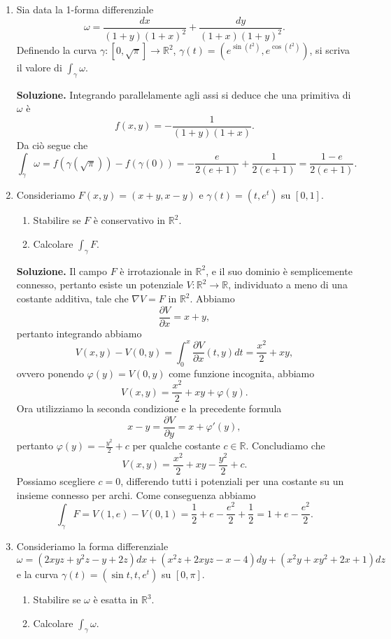 \begin{enumerate}
	
	\item Sia data la 1-forma differenziale
	\[
	\omega = \frac{dx}{(1 + y)(1 + x)^2} + \frac{dy}{(1 + x)(1 + y)^2}.
	\]
	Definendo la curva $\gamma: [0, \sqrt{\pi}] \to \mathbb{R}^2$, $\gamma(t) = \left(e^{\sin(t^2)}, e^{\cos(t^2)}\right)$, si scriva il valore di $\int_{\gamma} \omega$.
	
	\textbf{Soluzione.}
		Integrando parallelamente agli assi si deduce che una primitiva di $\omega$ è
		\[
		f(x,y) = -\frac{1}{(1 + y)(1 + x)}.
		\]
		Da ciò segue che
		\[
		\int_{\gamma} \omega = f(\gamma(\sqrt{\pi})) - f(\gamma(0)) = -\frac{e}{2(e + 1)} + \frac{1}{2(e + 1)} = \frac{1 - e}{2(e + 1)}.
		\]

	
	\item Consideriamo $F(x,y) = (x + y, x - y)$ e $\gamma(t) = (t, e^t)$ su $[0,1]$.
	\begin{enumerate}
		\item Stabilire se $F$ è conservativo in $\mathbb{R}^2$.
		\item Calcolare $\int_{\gamma} F$.
	\end{enumerate}
	
	\textbf{Soluzione.}
		Il campo $F$ è irrotazionale in $\mathbb{R}^2$, e il suo dominio è semplicemente connesso, pertanto esiste un potenziale $V: \mathbb{R}^2 \to \mathbb{R}$, individuato a meno di una costante additiva, tale che $\nabla V = F$ in $\mathbb{R}^2$. Abbiamo
		\[
		\frac{\partial V}{\partial x} = x + y,
		\]
		pertanto integrando abbiamo
		\[
		V(x,y) - V(0,y) = \int_0^x \frac{\partial V}{\partial x}(t,y) dt = \frac{x^2}{2} + x y,
		\]
		ovvero ponendo $\varphi(y) = V(0,y)$ come funzione incognita, abbiamo
		\[
		V(x,y) = \frac{x^2}{2} + x y + \varphi(y).
		\]
		Ora utilizziamo la seconda condizione e la precedente formula
		\[
		x - y = \frac{\partial V}{\partial y} = x + \varphi'(y),
		\]
		pertanto $\varphi(y) = -\frac{y^2}{2} + c$ per qualche costante $c \in \mathbb{R}$. Concludiamo che
		\[
		V(x,y) = \frac{x^2}{2} + x y - \frac{y^2}{2} + c.
		\]
		Possiamo scegliere $c = 0$, differendo tutti i potenziali per una costante su un insieme connesso per archi. Come conseguenza abbiamo
		\[
		\int_{\gamma} F = V(1,e) - V(0,1) = \frac{1}{2} + e - \frac{e^2}{2} + \frac{1}{2} = 1 + e - \frac{e^2}{2}.
		\]
	
	
	\item Consideriamo la forma differenziale
	\[
	\omega = (2x y z + y^2 z - y + 2z) dx + (x^2 z + 2x y z - x - 4) dy + (x^2 y + x y^2 + 2x + 1) dz
	\]
	e la curva $\gamma(t) = (\sin t, t, e^t)$ su $[0, \pi]$.
	\begin{enumerate}
		\item Stabilire se $\omega$ è esatta in $\mathbb{R}^3$.
		\item Calcolare $\int_{\gamma} \omega$.
	\end{enumerate}
	

\end{enumerate}

